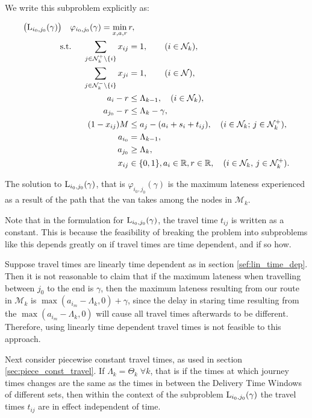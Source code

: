 We write this subproblem explicitly as:

\begin{align}
\label{form:det_subproblem}
\begin{split}
\bigl(\operatorname{L}_{i_0,j_0}(\gamma)\bigr)\quad
\varphi_{i_0,j_0}(\gamma)=\min_{x,a,r}\,&r,\\
\text{s.t. }\quad \sum_{j\in{\mathcal N}_{k}^+\setminus\{i\}} x_{ij}&=1,\qquad (i\in{\mathcal N}_k),\\
\sum_{j\in{\mathcal N}_{k}^-\setminus\{i\}} x_{ji}&=1,\qquad(i\in{\mathcal N}),\\
a_i-r&\leq \Lambda_{k-1},\quad(i\in{\mathcal N}_k),\\
a_{j_0} -r& \leq \Lambda_k - \gamma, \\
(1-x_{ij})M&\leq a_j - (a_i+s_i+t_{ij}),\quad(i\in{\mathcal N}_k;\,j\in{\mathcal N}_k^+),\\
a_{i_0}&=\Lambda_{k-1},\\
a_{j_0}&\geq \Lambda_{k},\\
x_{ij}&\in\{0,1\},  a_i\in\mathbb{R}, r\in\mathbb{R},\quad(i\in{\mathcal N}_k,\,j\in{\mathcal N}_k^+).
\end{split}
\end{align}

The solution to $\operatorname{L}_{i_0,j_0}(\gamma)$, that is $\varphi_{i_0,j_0}(\gamma)$ is the maximum lateness experienced as a result of the path that the van takes among the nodes in $\mathcal{M}_k$.



Note that in the formulation for $\operatorname{L}_{i_0, j_0}(\gamma)$, the travel time $t_{ij}$ is written as a constant. This is because the feasibility of breaking the problem into subproblems like this depends greatly on if travel times are time dependent, and if so how. 

Suppose travel times are linearly time dependent as in section \ref{sef:lin_time_dep}. Then it is not reasonable to claim that if the maximum lateness when travelling between $j_0$ to the end is $\gamma$, then the maximum lateness resulting from our route in $\mathcal{M}_k$ is $\max(a_{i_m}-\Lambda_k, 0) + \gamma$, since the delay in staring time resulting from the $\max(a_{i_m}-\Lambda_k, 0)$ will cause all travel times afterwards to be different. Therefore, using linearly time dependent travel times is not feasible to this approach.

Next consider piecewise constant travel times, as used in section \ref{sec:piece_const_travel}. If $\Lambda_k = \Theta_k\; \forall k$, that is if the times at which journey times changes are the same as the times in between the Delivery Time Windows of different sets, then within the context of the subproblem $\operatorname{L}_{i_0, j_0}(\gamma)$ the travel times $t_{ij}$ are in effect independent of time.

